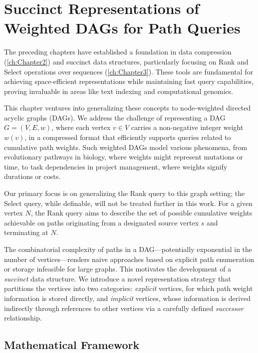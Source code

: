 \chapter{Succinct Representations of Weighted DAGs for Path Queries}
\label{chap:succinct_dags}

The preceding chapters have established a foundation in data compression (\autoref{ch:Chapter2}) and succinct data structures, particularly focusing on Rank and Select operations over sequences (\autoref{ch:Chapter3}). These tools are fundamental for achieving space-efficient representations while maintaining fast query capabilities, proving invaluable in areas like text indexing and computational genomics.

This chapter ventures into generalizing these concepts to node-weighted directed acyclic graphs (DAGs). We address the challenge of representing a DAG $G=(V, E, w)$, where each vertex $v \in V$ carries a non-negative integer weight $w(v)$, in a compressed format that efficiently supports queries related to cumulative path weights. Such weighted DAGs model various phenomena, from evolutionary pathways in biology, where weights might represent mutations or time, to task dependencies in project management, where weights signify durations or costs.

Our primary focus is on generalizing the Rank query to this graph setting; the Select query, while definable, will not be treated further in this work. For a given vertex $N$, the Rank query aims to describe the set of possible cumulative weights achievable on paths originating from a designated source vertex $s$ and terminating at $N$.

The combinatorial complexity of paths in a DAG—potentially exponential in the number of vertices—renders naive approaches based on explicit path enumeration or storage infeasible for large graphs. This motivates the development of a \emph{succinct} data structure. We introduce a novel representation strategy that partitions the vertices into two categories: \emph{explicit} vertices, for which path weight information is stored directly, and \emph{implicit} vertices, whose information is derived indirectly through references to other vertices via a carefully defined \emph{successor} relationship.

\section{Mathematical Framework}
\label{sec:dag_formal_defs}

